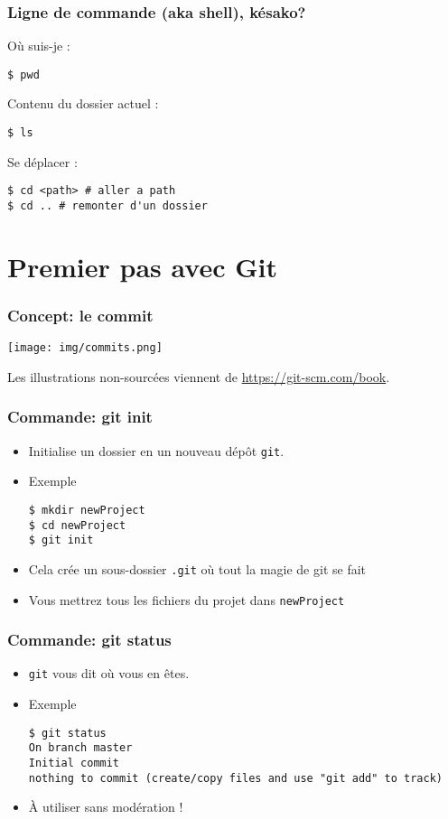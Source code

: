 \documentclass{beamer}
\begin{document}
\begin{frame}[fragile]
\frametitle{Ligne de commande (aka shell), késako?}
Où suis-je :
\begin{lstlisting}
$ pwd
\end{lstlisting}
Contenu du dossier actuel :
\begin{lstlisting}
$ ls
\end{lstlisting}
Se déplacer :
\begin{lstlisting}
$ cd <path> # aller a path
$ cd .. # remonter d'un dossier
\end{lstlisting}
\end{frame}

\section{Premier pas avec Git}

\begin{frame}
\frametitle{Concept: le \textbf{commit}}

\begin{center}
    \texttt{[image: img/commits.png]}
\end{center}
\footnotesize{Les illustrations non-sourcées viennent de \url{https://git-scm.com/book}.}
\end{frame}

\begin{frame}[fragile]
\frametitle{Commande: git init}
\begin{itemize}
\item Initialise un dossier en un nouveau dépôt \texttt{git}.
\item Exemple
\begin{lstlisting}
$ mkdir newProject
$ cd newProject
$ git init
\end{lstlisting}
\item Cela crée un sous-dossier \texttt{.git} où tout la magie de git se fait
\item Vous mettrez tous les fichiers du projet dans \texttt{newProject}
\end{itemize}
\end{frame}

\begin{frame}[fragile]
\frametitle{Commande: git status}
\begin{itemize}
    \item \texttt{git} vous dit o\`u vous en êtes.
    \item Exemple
\begin{lstlisting}
$ git status
On branch master
Initial commit
nothing to commit (create/copy files and use "git add" to track)
\end{lstlisting}
\item À utiliser sans modération !
\end{itemize}
\end{frame}
\end{document}
